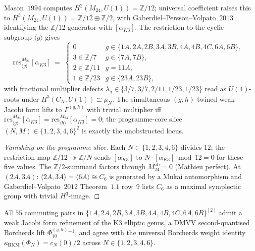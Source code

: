 \begin{proposition}
\label{prop:k3e-H3-transgression}
Mason~$1994$ computes $H^2(M_{24}, U(1)) = \mathbb{Z}/12$; universal coefficient raises this to $H^3(M_{24}, U(1)) = \mathbb{Z}/12 \oplus \mathbb{Z}/2$, with Gaberdiel--Persson--Volpato~$2013$ identifying the $\mathbb{Z}/12$-generator with $[\alpha_{K3}]$. The restriction to the cyclic subgroup $\langle g \rangle$ gives
\begin{equation}
\label{eq:k3e-H3-restriction}
\mathrm{res}^{M_{24}}_{\langle g \rangle} [\alpha_{K3}] \;=\; \begin{cases}
0 & g \in \{1A, 2A, 2B, 3A, 3B, 4A, 4B, 4C, 6A, 6B\}, \\
3 \in \mathbb{Z}/7 & g \in \{7A, 7B\}, \\
2 \in \mathbb{Z}/11 & g = 11A, \\
1 \in \mathbb{Z}/23 & g \in \{23A, 23B\},
\end{cases}
\end{equation}
with fractional multiplier defects $\lambda_g \in \{3/7, 3/7, 2/11, 1/23, 1/23\}$ read as $U(1)$-roots under $H^3(C_N, U(1)) \cong \mu_N$. The simultaneous $(g, h)$-twined weak Jacobi form lifts to $\Gamma^{(g, h)}$ with trivial multiplier iff $\mathrm{res}^{M_{24}}_{\langle g \rangle} [\alpha_{K3}] = \mathrm{res}^{M_{24}}_{\langle h \rangle} [\alpha_{K3}] = 0$; the programme-core slice $(N, M) \in \{1, 2, 3, 4, 6\}^2$ is exactly the unobstructed locus.
\end{proposition}

\begin{proof}[Vanishing on the programme slice]
Each $N \in \{1, 2, 3, 4, 6\}$ divides $12$; the restriction map $\mathbb{Z}/12 \twoheadrightarrow \mathbb{Z}/N$ sends $[\alpha_{K3}]$ to $N \cdot [\alpha_{K3}] \bmod 12 = 0$ for these five values. The $\mathbb{Z}/2$-summand factors through $M_{24}^{\mathrm{ab}} = 0$ (Mathieu perfect). At $(2A, 3A)$: $\langle 2A, 3A \rangle = \langle 6A \rangle \cong C_6$ is generated by a Mukai automorphism and Gaberdiel--Volpato~$2012$ Theorem~$1.1$ row~$9$ lists $C_6$ as a maximal symplectic group with trivial $H^3$-image.
\end{proof}

\begin{theorem}
\label{thm:k3e-55-pair-commuting-matrix}
All $55$ commuting pairs in $\{1A, 2A, 2B, 3A, 3B, 4A, 4B, 4C, 6A, 6B\}^{[2]}$ admit a weak Jacobi form refinement of the K3 elliptic genus, a DMVV second-quantised Borcherds lift $\Phi^{(g, h)}_{10}{}^{-1}$, and agree with the universal Borcherds weight identity $\kappa_{\mathrm{BKM}}(\Phi_N) = c_N(0)/2$ across $N \in \{1, 2, 3, 4, 6\}$.
\end{theorem}

